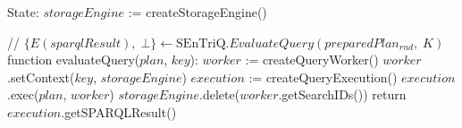 State:
    $storageEngine$ := createStorageEngine()

// $\{E(sparqlResult), \; \bot\} \leftarrow \textrm{SEnTriQ}.EvaluateQuery(preparedPlan_{rnd}, \; K)$
function evaluateQuery($plan$, \; $key$):
    $worker$ := createQueryWorker()
    $worker$.setContext($key$, $storageEngine$)
    $execution$ := createQueryExecution()
    $execution$.exec($plan$, $worker$)
    $storageEngine$.delete($worker$.getSearchIDs())
    return $execution$.getSPARQLResult()